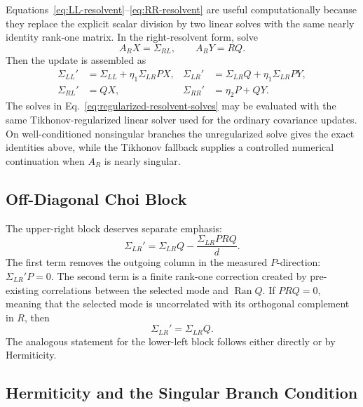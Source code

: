 \documentclass[aps,prb,onecolumn,nofootinbib,superscriptaddress]{revtex4-2}
\newcommand{\Ran}{\operatorname{Ran}}
\theoremstyle{plain}
\theoremstyle{definition}
\begin{document}
Equations~\eqref{eq:LL-resolvent}--\eqref{eq:RR-resolvent} are useful
computationally because they replace the explicit scalar division by two
linear solves with the same nearly identity rank-one matrix.  In the
right-resolvent form, solve
\begin{equation}
  A_RX=\Sigma_{RL},
  \qquad
  A_RY=RQ.
  \label{eq:regularized-resolvent-solves}
\end{equation}
Then the update is assembled as
\begin{align}
  \Sigma_{LL}'&=\Sigma_{LL}+\eta_1\Sigma_{LR}PX,
  &
  \Sigma_{LR}'&=\Sigma_{LR}Q+\eta_1\Sigma_{LR}PY,
  \nonumber\\
  \Sigma_{RL}'&=QX,
  &
  \Sigma_{RR}'&=\eta_2P+QY.
  \label{eq:regularized-resolvent-assembly}
\end{align}
The solves in Eq.~\eqref{eq:regularized-resolvent-solves} may be evaluated
with the same Tikhonov-regularized linear solver used for the ordinary
covariance updates.  On well-conditioned nonsingular branches the
unregularized solve gives the exact identities above, while the Tikhonov
fallback supplies a controlled numerical continuation when \(A_R\) is nearly
singular.

\subsection{Off-Diagonal Choi Block}

The upper-right block deserves separate emphasis:
\begin{equation}
  \Sigma_{LR}'
  =
  \Sigma_{LR}Q
  -
  \frac{\Sigma_{LR}PRQ}{d}.
  \label{eq:offdiag-interpretation}
\end{equation}
The first term removes the outgoing column in the measured \(P\)-direction:
\(\Sigma_{LR}'P=0\).  The second term is a finite rank-one correction created
by pre-existing correlations between the selected mode and \(\Ran Q\).  If
\(PRQ=0\), meaning that the selected mode is uncorrelated with its
orthogonal complement in \(R\), then
\begin{equation}
  \Sigma_{LR}'=\Sigma_{LR}Q.
  \label{eq:offdiag-decoupled}
\end{equation}
The analogous statement for the lower-left block follows either directly or
by Hermiticity.

\subsection{Hermiticity and the Singular Branch Condition}
\end{document}
